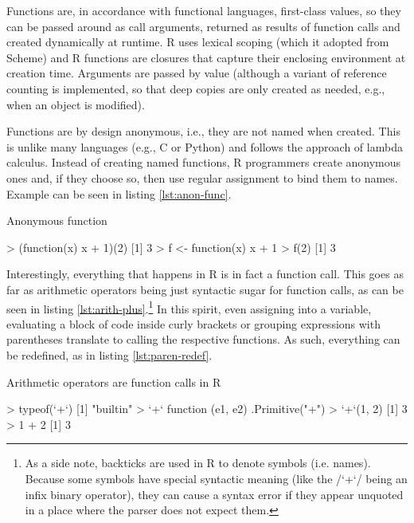 Functions are, in accordance with functional languages, first-class values, so they can be passed around as call arguments, returned as results of function calls and created dynamically at runtime. R uses lexical scoping (which it adopted from Scheme) and R functions are closures that capture their enclosing environment at creation time. Arguments are passed by value (although a variant of reference counting is implemented, so that deep copies are only created as needed, e.g., when an object is modified).

Functions are by design anonymous, i.e., they are not named when created. This is unlike many languages (e.g., C or Python) and follows the approach of lambda calculus. Instead of creating named functions, R programmers create anonymous ones and, if they choose so, then use regular assignment to bind them to names. Example can be seen in listing \ref{lst:anon-func}.

\begin{listing}[htbp]
  \caption{\label{lst:anon-func}Anonymous function}
  \begin{rcode}
> (function(x) x + 1)(2)
[1] 3
> f <- function(x) x + 1
> f(2)
[1] 3
  \end{rcode}
\end{listing}

Interestingly, everything that happens in R is in fact a function call. This goes as far as arithmetic operators being just syntactic sugar for function calls, as can be seen in listing \ref{lst:arith-plus}.\footnote{As a side note, backticks are used in R to denote symbols (i.e. names). Because some symbols have special syntactic meaning (like the \rinline/`+`/ being an infix binary operator), they can cause a syntax error if they appear unquoted in a place where the parser does not expect them.} In this spirit, even assigning into a variable, evaluating a block of code inside curly brackets or grouping expressions with parentheses translate to calling the respective functions. As such, everything can be redefined, as in listing \ref{lst:paren-redef}.

\begin{listing}[htbp]
  \caption{\label{lst:arith-plus}Arithmetic operators are function calls in R}
  \begin{rcode}
> typeof(`+`)
[1] "builtin"
> `+`
function (e1, e2)  .Primitive("+")
> `+`(1, 2)
[1] 3
> 1 + 2
[1] 3
  \end{rcode}
\end{listing}

